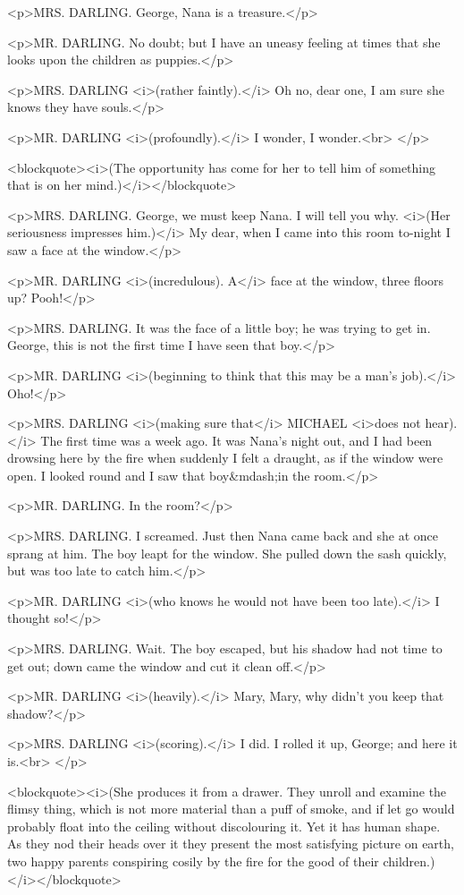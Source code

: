 <p>MRS. DARLING. George, Nana is a treasure.</p>

<p>MR. DARLING. No doubt; but I have an uneasy feeling at times that
she looks upon the children as puppies.</p>

<p>MRS. DARLING <i>(rather faintly).</i> Oh no, dear one, I am sure
she knows they have souls.</p>

<p>MR. DARLING <i>(profoundly).</i> I wonder, I wonder.<br>
</p>

<blockquote><i>(The opportunity has come for her to tell him of
something that is on her mind.)</i></blockquote>

<p>MRS. DARLING. George, we must keep Nana. I will tell you why.
<i>(Her seriousness impresses him.)</i> My dear, when I came into
this room to-night I saw a face at the window.</p>

<p>MR. DARLING <i>(incredulous). A</i> face at the window, three
floors up? Pooh!</p>

<p>MRS. DARLING. It was the face of a little boy; he was trying to
get in. George, this is not the first time I have seen that boy.</p>

<p>MR. DARLING <i>(beginning to think that this may be a man's
job).</i> Oho!</p>

<p>MRS. DARLING <i>(making sure that</i> MICHAEL <i>does not
hear).</i> The first time was a week ago. It was Nana's night out,
and I had been drowsing here by the fire when suddenly I felt a
draught, as if the window were open. I looked round and I saw that
boy&mdash;in the room.</p>

<p>MR. DARLING. In the room?</p>

<p>MRS. DARLING. I screamed. Just then Nana came back and she at once
sprang at him. The boy leapt for the window. She pulled down the sash
quickly, but was too late to catch him.</p>

<p>MR. DARLING <i>(who knows he would not have been too late).</i> I
thought so!</p>

<p>MRS. DARLING. Wait. The boy escaped, but his shadow had not time
to get out; down came the window and cut it clean off.</p>

<p>MR. DARLING <i>(heavily).</i> Mary, Mary, why didn't you keep that
shadow?</p>

<p>MRS. DARLING <i>(scoring).</i> I did. I rolled it up, George; and
here it is.<br>
</p>

<blockquote><i>(She produces it from a drawer. They unroll and
examine the flimsy thing, which is not more material than a puff of
smoke, and if let go would probably float into the ceiling without
discolouring it. Yet it has human shape. As they nod their heads over
it they present the most satisfying picture on earth, two happy
parents conspiring cosily by the fire for the good of their
children.)</i></blockquote>

